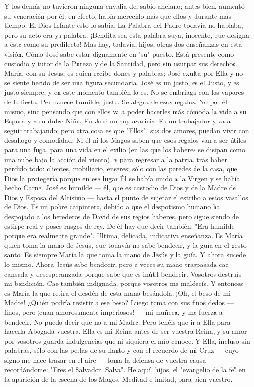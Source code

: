 \documentclass[12pt]{book} %
\begin{document}
Y los demás no tuvieron ninguna envidia del sabio anciano; antes bien, aumentó su veneración por él: en efecto, había 
merecido más que ellos y durante más tiempo. El Dios-Infante esto lo sabía. La Palabra del Padre todavía no hablaba, pero su acto era ya palabra. ¡Bendita sea esta palabra suya, inocente, que designa a éste como su predilecto! 
Mas hay, todavía, hijos, otras dos enseñanzas en esta visión. 
Cómo José sabe estar dignamente en "su" puesto. Está presente como custodio y tutor de la Pureza y de la Santidad, 
pero sin usurpar sus derechos. María, con su Jesús, es quien recibe dones y palabras; José exulta por Ella y no se siente herido de ser una figura secundaria. José es un justo, es el Justo, y es justo siempre, y en este momento también lo es. No se embriaga con los vapores de la fiesta. 
Permanece humilde, justo. 
Se alegra de esos regalos. No por él mismo, sino pensando que con ellos va a poder hacerles más cómoda la vida a su Esposa y a su dulce Niño. En José no hay avaricia. Es un trabajador y va a seguir trabajando; pero otra cosa es que "Ellos", sus dos amores, puedan vivir con desahogo y comodidad. Ni él ni los Magos saben que esos regalos van a ser útiles para una fuga, para una vida en el exilio (en las que los haberes se disipan como una nube bajo la acción del viento), y para regresar a la patria, tras haber perdido todo: clientes, mobiliario, enseres; sólo con las paredes de la casa, que Dios la protegería porque en ese lugar Él se había unido a la Virgen y se había hecho Carne. 
José es humilde — él, que es custodio de Dios y de la Madre de Dios y Esposa del Altísimo — hasta el punto de sujetar el 
estribo a estos vasallos de Dios. Es un pobre carpintero, debido a que el despotismo humano ha despojado a los herederos de David de sus regios haberes, pero sigue siendo de estirpe real y posee rasgos de rey. De él hay que decir también: "Era humilde porque era realmente grande". 
Ultima, delicada, indicativa enseñanza. 
Es María quien toma la mano de Jesús, que todavía no sabe bendecir, y la guía en el gesto santo. 
Es siempre María la que toma la mano de Jesús y la guía. Y ahora sucede lo mismo. Ahora Jesús sabe bendecir, pero a 
veces su mano traspasada cae cansada y desesperanzada porque sabe que es inútil bendecir. Vosotros destruís mi bendición. Cae también indignada, porque vosotros me maldecís. Y entonces es María la que retira el desdén de esta mano besándola. ¡Oh, el beso de mi Madre! ¿Quién podría resistir a ese beso? Luego toma con sus finos dedos — finos, pero ¡cuan amorosamente imperiosos! — mi muñeca, y me fuerza a bendecir. 
No puedo decir que no a mi Madre. Pero tenéis que ir a Ella para hacerla Abogada vuestra. Ella es mi Reina antes de ser 
vuestra Reina, y su amor por vosotros guarda indulgencias que ni siquiera el mío conoce. Y Ella, incluso sin palabras, sólo con las perlas de su llanto y con el recuerdo de mi Cruz — cuyo signo me hace trazar en el aire — toma la defensa de vuestra causa recordándome: "Eres el Salvador. Salva". 
He aquí, hijos, el "evangelio de la fe" en la aparición de la escena de los Magos. Meditad e imitad, para bien vuestro. 
 
\end{document}
